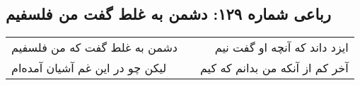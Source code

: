 \begin{center}
\section*{رباعی شماره ۱۲۹: دشمن به غلط گفت من فلسفیم}
\label{sec:sh129}
\begin{longtable}{l p{0.5cm} r}
دشمن به غلط گفت که من فلسفیم
&&
ایزد داند که آنچه او گفت نیم
\\
لیکن چو در این غم آشیان آمده‌ام
&&
آخر کم از آنکه من بدانم که کیم
\\
\end{longtable}
\end{center}
